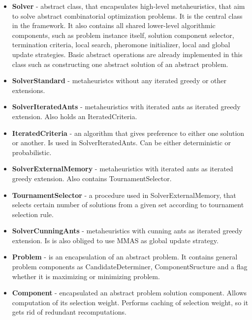 \documentclass[11pt,a4paper,oneside]{book}
\begin{document}
\begin{itemize}
\item \textbf{Solver} - abstract class, that encapsulates high-level metaheuristics, that aim to solve abstract combinatorial optimization problems. It is the central class in the framework. It also contains all shared lower-level algorithmic components, such as problem instance itself, solution component selector, termination criteria, local search, pheromone initializer, local and global update strategies. Basic abstract operations are already implemented in this class such as constructing one abstract solution of an abstract problem.

\item \textbf{SolverStandard} - metaheuristcs without any iterated greedy or other extensions.

\item \textbf{SolverIteratedAnts} - metaheuristics with iterated ants as iterated greedy extension. Also holds an IteratedCriteria.

\item \textbf{IteratedCriteria} - an algorithm that gives preference to either one solution or another. Is used in SolverIteratedAnts. Can be either deterministic or probabilistic.

\item \textbf{SolverExternalMemory} - metaheuristics with iterated ants as iterated greedy extension. Also contains TournamentSelector.

\item \textbf{TournamentSelector} - a procedure used in SolverExternalMemory, that selects certain number of solutions from a given set according to tournament selection rule.

\item \textbf{SolverCunningAnts} - metaheuristics with cunning ants as iterated greedy extension. Is is also obliged to use MMAS as global update strategy.

\item \textbf{Problem} - is an encapsulation of an abstract problem. It contains general problem components as CandidateDeterminer, ComponentSructure and a flag whether it is maximizing or minimizing problem.

\item \textbf{Component} - encapsulated an abstract problem solution component. Allows computation of its selection weight. Performs caching of selection weight, so it gets rid of redundant recomputations.


\end{itemize}
\end{document}
